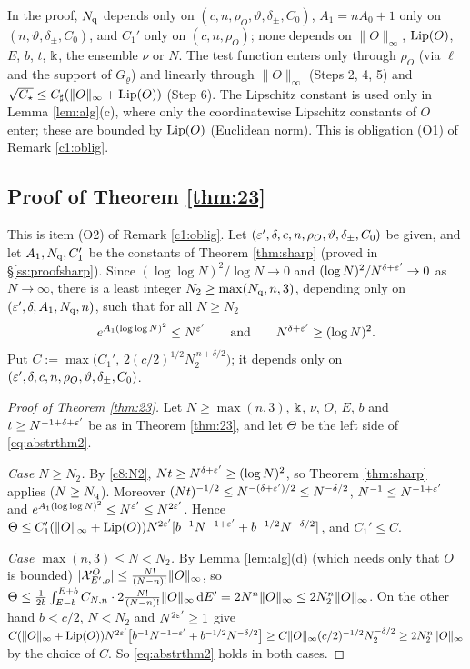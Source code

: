 \begin{remark}\label{rem:Odep}
In the proof, $N_{\rm q}$ depends only on $(c,n,\rho_O,\vartheta,\delta_\pm,C_0)$, $A_1=nA_0+1$ only on $(n,\vartheta,\delta_\pm,C_0)$, and $C_1'$ only on $(c,n,\rho_O)$; none depends on $\|O\|_\infty$, $\operatorname{Lip}(O)$, $E$, $b$, $t$, $\Bbbk$, the ensemble $\nu$ or $N$. The test function enters only through $\rho_O$ (via $\ell$ and the support of $G_\varrho$) and linearly through $\|O\|_\infty$ (Steps 2, 4, 5) and $\sqrt{C_\star}\le C_\sharp(\|O\|_\infty+\operatorname{Lip}(O))$ (Step 6).
The Lipschitz constant is used only in Lemma \ref{lem:alg}(c), where only the coordinatewise Lipschitz constants of $O$ enter; these are bounded by $\operatorname{Lip}(O)$ (Euclidean norm). This is obligation (O1) of Remark \ref{c1:oblig}.
\end{remark}

\subsection{Proof of Theorem \ref{thm:23}}\label{ss:proof23}

This is item (O2) of Remark \ref{c1:oblig}. Let $(\varepsilon',\delta,c,n,\rho_O,\vartheta,\delta_\pm,C_0)$ be given, and let $A_1,N_{\rm q},C_1'$ be the constants of Theorem \ref{thm:sharp} (proved in \S\ref{ss:proofsharp}). Since $(\log\log N)^2/\log N\to0$ and $(\log N)^2/N^{\delta+\varepsilon'}\to0$ as $N\to\infty$, there is a least integer
$N_2\ge\max(N_{\rm q},n,3)$, depending only on $(\varepsilon',\delta,A_1,N_{\rm q},n)$, such that for all $N\ge N_2$
\begin{equation}\label{c8:N2}
e^{A_1(\log\log N)^2}\le N^{\varepsilon'}\qquad\text{and}\qquad N^{\delta+\varepsilon'}\ge(\log N)^2 .
\end{equation}
Put $C:=\max\big(C_1',\,2(c/2)^{1/2}N_2^{\,n+\delta/2}\big)$; it depends only on $(\varepsilon',\delta,c,n,\rho_O,\vartheta,\delta_\pm,C_0)$.

\begin{proof}[Proof of Theorem \ref{thm:23}]
Let $N\ge\max(n,3)$, $\Bbbk$, $\nu$, $O$, $E$, $b$ and $t\ge N^{-1+\delta+\varepsilon'}$ be as in Theorem \ref{thm:23}, and let $\Theta$ be the left side of \eqref{eq:abstrthm2}.

\emph{Case $N\ge N_2$.} By \eqref{c8:N2}, $Nt\ge N^{\delta+\varepsilon'}\ge(\log N)^2$, so Theorem \ref{thm:sharp} applies ($N\ge N_{\rm q}$). Moreover $(Nt)^{-1/2}\le N^{-(\delta+\varepsilon')/2}\le N^{-\delta/2}$, $N^{-1}\le N^{-1+\varepsilon'}$ and $e^{A_1(\log\log N)^2}\le N^{\varepsilon'}\le N^{2\varepsilon'}$. Hence
$\Theta\le C_1'(\|O\|_\infty+\operatorname{Lip}(O))N^{2\varepsilon'}[b^{-1}N^{-1+\varepsilon'}+b^{-1/2}N^{-\delta/2}]$, and $C_1'\le C$.

\emph{Case $\max(n,3)\le N<N_2$.} By Lemma \ref{lem:alg}(d) (which needs only that $O$ is bounded) $|\mathcal{X}^O_{E',\varrho}|\le\frac{N!}{(N-n)!}\|O\|_\infty$, so
$\Theta\le\frac1{2b}\int_{E-b}^{E+b}C_{N,n}\cdot2\frac{N!}{(N-n)!}\|O\|_\infty\,\mathrm{d} E'=2N^n\|O\|_\infty\le2N_2^n\|O\|_\infty$.
On the other hand $b<c/2$, $N<N_2$ and $N^{2\varepsilon'}\ge1$ give
$C(\|O\|_\infty+\operatorname{Lip}(O))N^{2\varepsilon'}\big[b^{-1}N^{-1+\varepsilon'}+b^{-1/2}N^{-\delta/2}\big]\ge C\|O\|_\infty(c/2)^{-1/2}N_2^{-\delta/2}\ge2N_2^n\|O\|_\infty$
by the choice of $C$. So \eqref{eq:abstrthm2} holds in both cases.
\end{proof}

